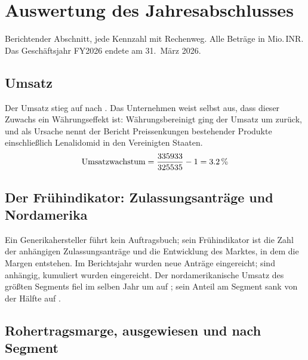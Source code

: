 \section{Auswertung des Jahresabschlusses}
\label{sec:abschluss-rdy}

Berichtender Abschnitt, jede Kennzahl mit Rechenweg. Alle Betr\"age in
Mio.\,INR. Das Gesch\"aftsjahr FY2026 endete am 31.~M\"arz 2026.

\subsection{Umsatz}

Der Umsatz stieg \Pct{\RdyUmsatzWachstum} auf \MioINR{\RdyUmsatzXXVI} nach
\MioINR{\RdyUmsatzXXV}.
Das Unternehmen weist selbst aus, dass dieser Zuwachs ein W\"ahrungseffekt
ist: W\"ahrungsbereinigt ging der Umsatz um \PctBetrag{\RdyOrganisch} zur\"uck, und
als Ursache nennt der Bericht Preissenkungen bestehender Produkte
einschlie{\ss}lich Lenalidomid in den Vereinigten
Staaten.
\[
  \text{Umsatzwachstum} = \frac{\RdyUmsatzXXVI}{\RdyUmsatzXXV} - 1
  = \Pct{\RdyUmsatzWachstum}
\]

\subsection{Der Fr\"uhindikator: Zulassungsantr\"age und Nordamerika}

Ein Generikahersteller f\"uhrt kein Auftragsbuch; sein Fr\"uhindikator ist die
Zahl der anh\"angigen Zulassungsantr\"age und die Entwicklung des Marktes, in
dem die Margen entstehen. Im Berichtsjahr wurden
\Stueck{\RdyAndaEingereicht} neue Antr\"age eingereicht;
\Stueck{\RdyAndaAnhaengig} sind anh\"angig, kumuliert wurden
\Stueck{\RdyAndaKumuliert} eingereicht.
Der nordamerikanische Umsatz des gr\"o{\ss}ten Segments fiel im selben Jahr um
\PctBetrag{\RdyNordamerikaWachstum} auf \MioINR{\RdyNordamerika};
sein Anteil am Segment sank von der H\"alfte auf
\Pct{\RdyNordamerikaAnteil}.

\subsection{Rohertragsmarge, ausgewiesen und nach Segment}

